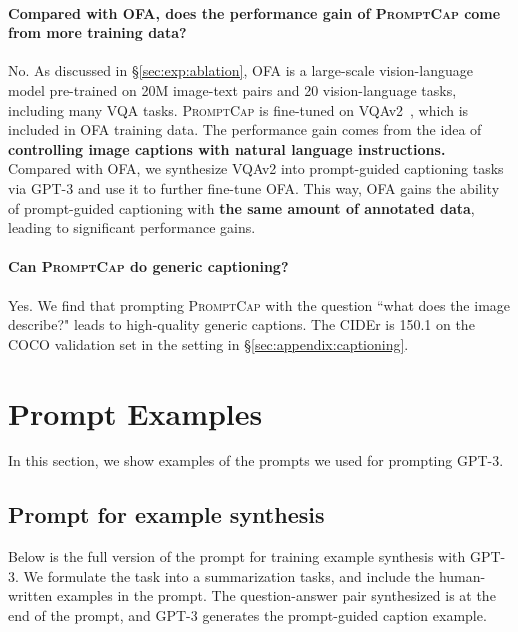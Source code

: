 \documentclass[10pt,twocolumn,letterpaper]{article}
\newcommand{\NAME}{\textsc{PromptCap}\xspace}
\begin{document}
\paragraph{Compared with OFA, does the performance gain of \NAME come from more training data?}
No. As discussed in \S\ref{sec:exp:ablation}, OFA is a large-scale vision-language model pre-trained on 20M image-text pairs and 20 vision-language tasks, including many VQA tasks. \NAME is fine-tuned on VQAv2~\cite{goyal2017making}, which is included in OFA training data. The performance gain comes from the idea of \textbf{controlling image captions with natural language instructions.} Compared with OFA, we synthesize VQAv2 into prompt-guided captioning tasks via GPT-3 and use it to further fine-tune OFA. This way, OFA gains the ability of prompt-guided captioning with \textbf{the same amount of annotated data}, leading to significant performance gains.

\paragraph{Can \NAME do generic captioning?}
Yes. We find that prompting \NAME with the question ``what does the image describe?" leads to high-quality generic captions. The CIDEr is 150.1 on the COCO validation set in the setting in \S\ref{sec:appendix:captioning}.






\section{Prompt Examples}
\label{appendix:prompt}

In this section, we show examples of the prompts we used for prompting GPT-3.

\subsection{Prompt for example synthesis}
\label{appendix:few shot}
Below is the full version of the prompt for training example synthesis with GPT-3.
We formulate the task into a summarization tasks, and include the human-written examples in the prompt. The question-answer pair synthesized is at the end of the prompt, and GPT-3 generates the prompt-guided caption example.
\end{document}

